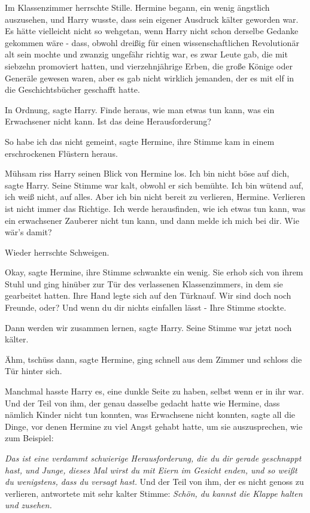 Im Klassenzimmer herrschte Stille. Hermine begann, ein wenig ängstlich
auszusehen, und Harry wusste, dass sein eigener Ausdruck kälter geworden war. Es
hätte vielleicht nicht so wehgetan, wenn Harry nicht schon derselbe Gedanke
gekommen wäre - dass, obwohl dreißig für einen wissenschaftlichen Revolutionär
alt sein mochte und zwanzig ungefähr richtig war, es zwar Leute gab, die mit
siebzehn promoviert hatten, und vierzehnjährige Erben, die große Könige oder
Generäle gewesen waren, aber es gab nicht wirklich jemanden, der es mit elf in
die Geschichtsbücher geschafft hatte.

\glqq In Ordnung\grqq{}, sagte Harry. \glqq Finde heraus, wie man etwas tun
kann, was ein Erwachsener nicht kann. Ist das deine Herausforderung?\grqq{}

\glqq So habe ich das nicht gemeint\grqq{}, sagte Hermine, ihre Stimme kam in
einem erschrockenen Flüstern heraus.

Mühsam riss Harry seinen Blick von Hermine los. \glqq Ich bin nicht böse auf
dich\grqq{}, sagte Harry. Seine Stimme war kalt, obwohl er sich bemühte. \glqq
Ich bin wütend auf, ich weiß nicht, auf alles. Aber ich bin nicht bereit zu
verlieren, Hermine. Verlieren ist nicht immer das Richtige. Ich werde
herausfinden, wie ich etwas tun kann, was ein erwachsener Zauberer nicht tun
kann, und dann melde ich mich bei dir. Wie wär's damit?\grqq{}

Wieder herrschte Schweigen.

\glqq Okay\grqq{}, sagte Hermine, ihre Stimme schwankte ein wenig. Sie erhob
sich von ihrem Stuhl und ging hinüber zur Tür des verlassenen Klassenzimmers, in
dem sie gearbeitet hatten. Ihre Hand legte sich auf den Türknauf. \glqq Wir sind
doch noch Freunde, oder? Und wenn du dir nichts einfallen lässt -\grqq{} Ihre
Stimme stockte.

\glqq Dann werden wir zusammen lernen\grqq{}, sagte Harry. Seine Stimme war
jetzt noch kälter.

\glqq Ähm, tschüss dann\grqq{}, sagte Hermine, ging schnell aus dem Zimmer und
schloss die Tür hinter sich.

Manchmal hasste Harry es, eine dunkle Seite zu haben, selbst wenn er in ihr war.
Und der Teil von ihm, der genau dasselbe gedacht hatte wie Hermine, dass nämlich
Kinder nicht tun konnten, was Erwachsene nicht konnten, sagte all die Dinge, vor
denen Hermine zu viel Angst gehabt hatte, um sie auszusprechen, wie zum
Beispiel:

\emph{Das ist eine verdammt schwierige Herausforderung, die du dir gerade geschnappt hast, und Junge, dieses Mal wirst du mit Eiern im Gesicht enden, und so weißt du wenigstens, dass du versagt hast.}
Und der Teil von ihm, der es nicht genoss zu verlieren, antwortete mit sehr
kalter Stimme:
\emph{ \glqq Schön, du kannst die Klappe halten und zusehen.}

